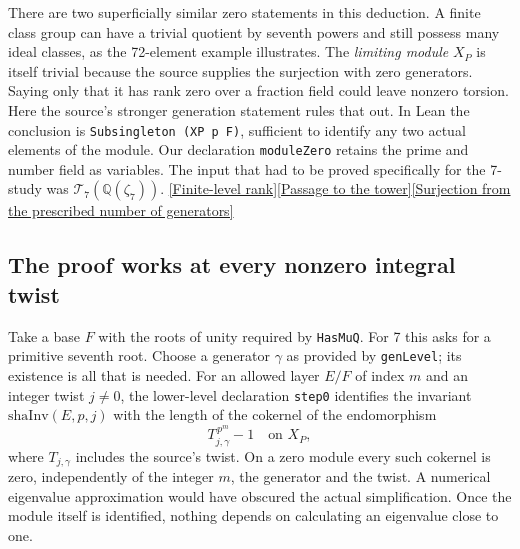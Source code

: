\documentclass[12pt,letterpaper]{article}
\begin{document}
There are two superficially similar zero statements in this deduction. A finite class group can have a trivial quotient by seventh powers and still possess many ideal classes, as the 72-element example illustrates. The \emph{limiting module} \(X_P\) is itself trivial because the source supplies the surjection with zero generators. Saying only that it has rank zero over a fraction field could leave nonzero torsion. Here the source's stronger generation statement rules that out. In Lean the conclusion is \texttt{Subsingleton (XP p F)}, sufficient to identify any two actual elements of the module. Our declaration \texttt{moduleZero} retains the prime and number field as variables. The input that had to be proved specifically for the 7-study was \(\mathcal T_7(\mathbb Q(\zeta_7))\). \href{https://github.com/nousentllc/riemann-hypothesis/blob/40e56bab026552e089d7afcfeff08d2defb9c005/src/Development/AutomorphicArithmetic/AutomorphicVarieties/QuadraticExtensions/LevelRk.lean}{[Finite-level rank]}\quad\href{https://github.com/nousentllc/riemann-hypothesis/blob/40e56bab026552e089d7afcfeff08d2defb9c005/src/Development/AutomorphicArithmetic/AutomorphicVarieties/QuadraticExtensions/LevUAnti.lean}{[Passage to the tower]}\quad\href{https://github.com/nousentllc/riemann-hypothesis/blob/40e56bab026552e089d7afcfeff08d2defb9c005/src/Development/AutomorphicArithmetic/AutomorphicVarieties/QuadraticExtensions/GenOfRk.lean}{[Surjection from the prescribed number of generators]}

\subsection{The proof works at every nonzero integral twist}

Take a base \(F\) with the roots of unity required by \texttt{HasMuQ}. For 7 this asks for a primitive seventh root. Choose a generator \(\gamma\) as provided by \texttt{genLevel}; its existence is all that is needed. For an allowed layer \(E/F\) of index \(m\) and an integer twist \(j\ne0\), the lower-level declaration \texttt{step0} identifies the invariant \(\mathrm{shaInv}(E,p,j)\) with the length of the cokernel of the endomorphism
\[
       T_{j,\gamma}^{\,p^m}-1\quad\text{on }X_P,
\]
where \(T_{j,\gamma}\) includes the source's twist. On a zero module every such cokernel is zero, independently of the integer \(m\), the generator and the twist. A numerical eigenvalue approximation would have obscured the actual simplification. Once the module itself is identified, nothing depends on calculating an eigenvalue close to one.
\end{document}

